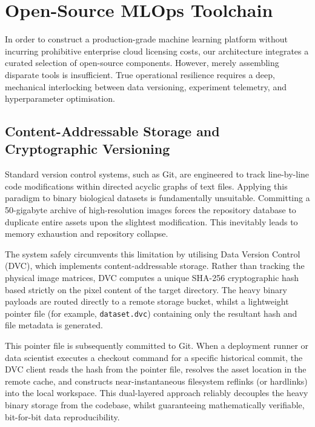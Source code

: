 \chapter{Open-Source MLOps Toolchain}
\label{ch:toolchain}

In order to construct a production-grade machine learning platform without incurring prohibitive enterprise cloud licensing costs, our architecture integrates a curated selection of open-source components. However, merely assembling disparate tools is insufficient. True operational resilience requires a deep, mechanical interlocking between data versioning, experiment telemetry, and hyperparameter optimisation.

\section{Content-Addressable Storage and Cryptographic Versioning}
\label{sec:dvc}

Standard version control systems, such as Git, are engineered to track line-by-line code modifications within directed acyclic graphs of text files. Applying this paradigm to binary biological datasets is fundamentally unsuitable. Committing a 50-gigabyte archive of high-resolution images forces the repository database to duplicate entire assets upon the slightest modification. This inevitably leads to memory exhaustion and repository collapse.

The system safely circumvents this limitation by utilising Data Version Control (DVC), which implements content-addressable storage. Rather than tracking the physical image matrices, DVC computes a unique SHA-256 cryptographic hash based strictly on the pixel content of the target directory. The heavy binary payloads are routed directly to a remote storage bucket, whilst a lightweight pointer file (for example, \texttt{dataset.dvc}) containing only the resultant hash and file metadata is generated.

This pointer file is subsequently committed to Git. When a deployment runner or data scientist executes a checkout command for a specific historical commit, the DVC client reads the hash from the pointer file, resolves the asset location in the remote cache, and constructs near-instantaneous filesystem reflinks (or hardlinks) into the local workspace. This dual-layered approach reliably decouples the heavy binary storage from the codebase, whilst guaranteeing mathematically verifiable, bit-for-bit data reproducibility.

